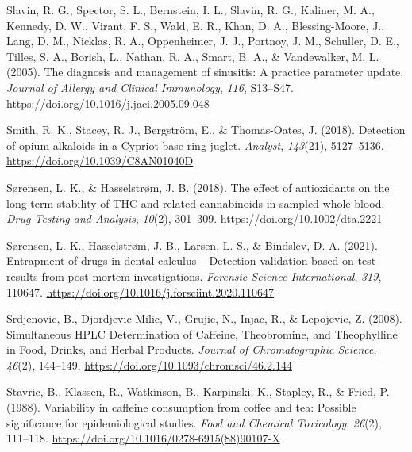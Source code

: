\documentclass[
]{article}
\newlength{\cslhangindent}
\newlength{\cslentryspacingunit} %
\newenvironment{CSLReferences}[2] %
 {%
  \setlength{\parindent}{0pt}
  \ifodd #1
  \let\oldpar\par
  \def\par{\hangindent=\cslhangindent\oldpar}
  \fi
  \setlength{\parskip}{#2\cslentryspacingunit}
 }%
 {}
\begin{document}
\begin{CSLReferences}{1}{0}
\leavevmode{}%
Slavin, R. G., Spector, S. L., Bernstein, I. L., Slavin, R. G., Kaliner,
M. A., Kennedy, D. W., Virant, F. S., Wald, E. R., Khan, D. A.,
Blessing-Moore, J., Lang, D. M., Nicklas, R. A., Oppenheimer, J. J.,
Portnoy, J. M., Schuller, D. E., Tilles, S. A., Borish, L., Nathan, R.
A., Smart, B. A., \& Vandewalker, M. L. (2005). The diagnosis and
management of sinusitis: {A} practice parameter update. \emph{Journal of
Allergy and Clinical Immunology}, \emph{116}, S13--S47.
\url{https://doi.org/10.1016/j.jaci.2005.09.048}

\leavevmode{}%
Smith, R. K., Stacey, R. J., Bergström, E., \& Thomas-Oates, J. (2018).
Detection of opium alkaloids in a {Cypriot} base-ring juglet.
\emph{Analyst}, \emph{143}(21), 5127--5136.
\url{https://doi.org/10.1039/C8AN01040D}

\leavevmode{}%
Sørensen, L. K., \& Hasselstrøm, J. B. (2018). The effect of
antioxidants on the long-term stability of {THC} and related
cannabinoids in sampled whole blood. \emph{Drug Testing and Analysis},
\emph{10}(2), 301--309. \url{https://doi.org/10.1002/dta.2221}

\leavevmode{}%
Sørensen, L. K., Hasselstrøm, J. B., Larsen, L. S., \& Bindslev, D. A.
(2021). Entrapment of drugs in dental calculus -- {Detection} validation
based on test results from post-mortem investigations. \emph{Forensic
Science International}, \emph{319}, 110647.
\url{https://doi.org/10.1016/j.forsciint.2020.110647}

\leavevmode{}%
Srdjenovic, B., Djordjevic-Milic, V., Grujic, N., Injac, R., \&
Lepojevic, Z. (2008). Simultaneous {HPLC Determination} of {Caffeine},
{Theobromine}, and {Theophylline} in {Food}, {Drinks}, and {Herbal
Products}. \emph{Journal of Chromatographic Science}, \emph{46}(2),
144--149. \url{https://doi.org/10.1093/chromsci/46.2.144}

\leavevmode{}%
Stavric, B., Klassen, R., Watkinson, B., Karpinski, K., Stapley, R., \&
Fried, P. (1988). Variability in caffeine consumption from coffee and
tea: {Possible} significance for epidemiological studies. \emph{Food and
Chemical Toxicology}, \emph{26}(2), 111--118.
\url{https://doi.org/10.1016/0278-6915(88)90107-X}


\end{CSLReferences}
\end{document}
